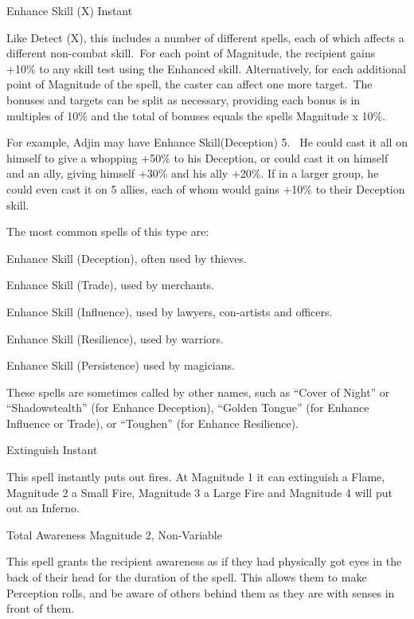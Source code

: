\begin{rpg-spell}
{Enhance Skill (X)}
{Instant}

Like Detect (X), this includes a number of different spells, each of which affects a different non-combat skill. For each point of Magnitude, the recipient gains +10\% to any skill test using the Enhanced skill.  Alternatively, for each additional point of Magnitude of the spell, the caster can affect one more target. The bonuses and targets can be split as necessary, providing each bonus is in multiples of 10\% and the total of bonuses equals the spells Magnitude x 10\%.

For example, Adjin may have Enhance Skill(Deception) 5.  He could cast it all on himself to give a whopping +50\% to his Deception, or could cast it on himself and an ally, giving himself +30\% and his ally +20\%. If in a larger group, he could even cast it on 5 allies, each of whom would gains +10\% to their Deception skill.

The most common spells of this type are:
\begin{rpg-list}
\item Enhance Skill (Deception), often used by thieves.
\item Enhance Skill (Trade), used by merchants.
\item Enhance Skill (Influence), used by lawyers, con-artists and officers.
\item Enhance Skill (Resilience), used by warriors.
\item Enhance Skill (Persistence) used by magicians.
\end{rpg-list}

These spells are sometimes called by other names, such as “Cover of Night” or “Shadowstealth” (for Enhance Deception), “Golden Tongue” (for Enhance Influence or Trade), or “Toughen” (for Enhance Resilience).
\end{rpg-spell}


\begin{rpg-spell}
{Extinguish}
{Instant}

This spell instantly puts out fires. At Magnitude 1 it can extinguish a Flame, Magnitude 2 a Small Fire, Magnitude 3 a Large Fire and Magnitude 4 will put out an Inferno.
\end{rpg-spell}


\begin{rpg-spell}
{Total Awareness}
{Magnitude 2, Non-Variable}

This spell grants the recipient awareness as if they had physically got eyes in the back of their head for the duration of the spell. This allows them to make Perception rolls, and be aware of others behind them as they are with senses in front of them.
\end{rpg-spell}



